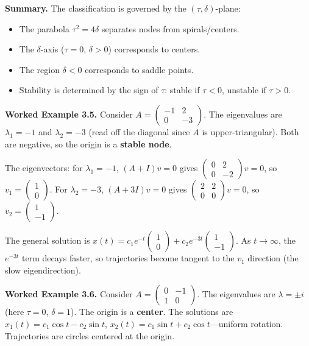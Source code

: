 \textbf{Summary.} The classification is governed by the $(\tau, \delta)$-plane:

\begin{itemize}[nosep]
  \item The parabola $\tau^2 = 4\delta$ separates nodes from spirals/centers.
  \item The $\delta$-axis ($\tau = 0$, $\delta > 0$) corresponds to centers.
  \item The region $\delta < 0$ corresponds to saddle points.
  \item Stability is determined by the sign of $\tau$: stable if $\tau < 0$, unstable if $\tau > 0$.
\end{itemize}

\textbf{Worked Example 3.5.} Consider $A = \begin{pmatrix} -1 & 2 \\ 0 & -3 \end{pmatrix}$. The eigenvalues are $\lambda_1 = -1$ and $\lambda_2 = -3$ (read off the diagonal since $A$ is upper-triangular). Both are negative, so the origin is a \textbf{stable node}.

The eigenvectors: for $\lambda_1 = -1$, $(A + I)v = 0$ gives $\begin{pmatrix} 0 & 2 \\ 0 & -2 \end{pmatrix}v = 0$, so $v_1 = \begin{pmatrix}1\\0\end{pmatrix}$. For $\lambda_2 = -3$, $(A + 3I)v = 0$ gives $\begin{pmatrix}2 & 2 \\ 0 & 0\end{pmatrix}v = 0$, so $v_2 = \begin{pmatrix}1 \\ -1\end{pmatrix}$.

The general solution is $x(t) = c_1 e^{-t}\begin{pmatrix}1\\0\end{pmatrix} + c_2 e^{-3t}\begin{pmatrix}1\\-1\end{pmatrix}$. As $t \to \infty$, the $e^{-3t}$ term decays faster, so trajectories become tangent to the $v_1$ direction (the slow eigendirection).

\textbf{Worked Example 3.6.} Consider $A = \begin{pmatrix} 0 & -1 \\ 1 & 0 \end{pmatrix}$. The eigenvalues are $\lambda = \pm i$ (here $\tau = 0$, $\delta = 1$). The origin is a \textbf{center}. The solutions are $x_1(t) = c_1 \cos t - c_2 \sin t$, $x_2(t) = c_1 \sin t + c_2 \cos t$---uniform rotation. Trajectories are circles centered at the origin.



